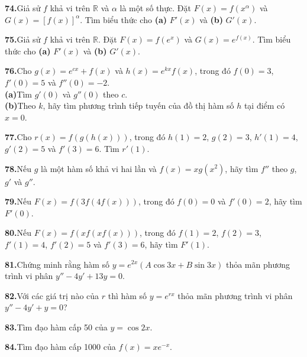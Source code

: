 \hfill
\begin{minipage}[t]{0.64\textwidth}
\textbf{74.}\enspace Giả sử $f$ khả vi trên $\mathbb{R}$ và $\alpha$ là một số thực. Đặt $F(x) = f(x^\alpha)$ và $G(x) = [f(x)]^\alpha$. Tìm biểu thức cho \textbf{(a)} $F'(x)$ và \textbf{(b)} $G'(x)$.

\vspace{0.65em}
\textbf{75.}\enspace Giả sử $f$ khả vi trên $\mathbb{R}$. Đặt $F(x) = f(e^x)$ và $G(x) = e^{f(x)}$. Tìm biểu thức cho \textbf{(a)} $F'(x)$ và \textbf{(b)} $G'(x)$.

\vspace{0.65em}
\textbf{76.}\enspace Cho $g(x) = e^{cx} + f(x)$ và $h(x) = e^{kx}f(x)$, trong đó $f(0) = 3$, $f'(0) = 5$ và $f''(0) = -2$.\\[0.2em]
\textbf{(a)}\enspace Tìm $g'(0)$ và $g''(0)$ theo $c$.\\[0.2em]
\textbf{(b)}\enspace Theo $k$, hãy tìm phương trình tiếp tuyến của đồ thị hàm số $h$ tại điểm có $x = 0$.

\vspace{0.65em}
\textbf{77.}\enspace Cho $r(x) = f(g(h(x)))$, trong đó $h(1) = 2$, $g(2) = 3$, $h'(1) = 4$, $g'(2) = 5$ và $f'(3) = 6$. Tìm $r'(1)$.

\vspace{0.65em}
\textbf{78.}\enspace Nếu $g$ là một hàm số khả vi hai lần và $f(x) = xg(x^2)$, hãy tìm $f''$ theo $g$, $g'$ và $g''$.

\vspace{0.65em}
\textbf{79.}\enspace Nếu $F(x) = f(3f(4f(x)))$, trong đó $f(0) = 0$ và $f'(0) = 2$, hãy tìm $F'(0)$.

\vspace{0.65em}
\textbf{80.}\enspace Nếu $F(x) = f(xf(xf(x)))$, trong đó $f(1) = 2$, $f(2) = 3$, $f'(1) = 4$, $f'(2) = 5$ và $f'(3) = 6$, hãy tìm $F'(1)$.

\vspace{0.65em}
\textbf{81.}\enspace Chứng minh rằng hàm số $y = e^{2x}(A\cos 3x + B\sin 3x)$ thỏa mãn phương trình vi phân $y'' - 4y' + 13y = 0$.

\vspace{0.65em}
\textbf{82.}\enspace Với các giá trị nào của $r$ thì hàm số $y = e^{rx}$ thỏa mãn phương trình vi phân $y'' - 4y' + y = 0$?

\vspace{0.65em}
\textbf{83.}\enspace Tìm đạo hàm cấp 50 của $y = \cos 2x$.

\vspace{0.65em}
\textbf{84.}\enspace Tìm đạo hàm cấp 1000 của $f(x) = xe^{-x}$.


\end{minipage}
